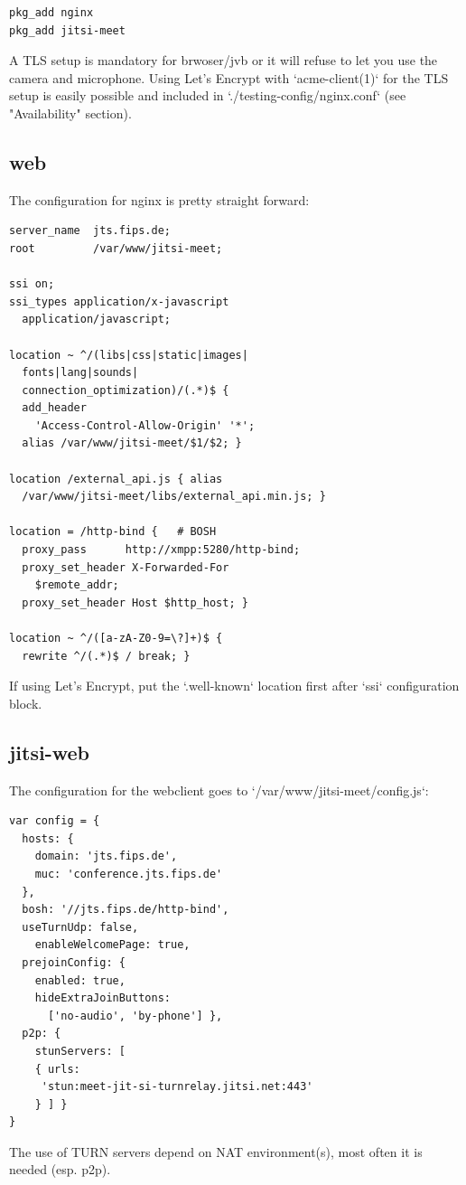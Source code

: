 \documentclass[10pt,conference]{IEEEtran}
\begin{document}
\begin{verbatim}
pkg_add nginx
pkg_add jitsi-meet
\end{verbatim}

A TLS setup is mandatory for brwoser/jvb or it will refuse to let you
use the camera and microphone.
Using Let's Encrypt with `acme-client(1)` for the TLS setup is easily possible and included
in `./testing-config/nginx.conf` (see "Availability" section).

\subsection{web}
The configuration for nginx is pretty straight forward:
\begin{verbatim}
server_name  jts.fips.de;
root         /var/www/jitsi-meet;

ssi on;
ssi_types application/x-javascript
  application/javascript;

location ~ ^/(libs|css|static|images|
  fonts|lang|sounds|
  connection_optimization)/(.*)$ {
  add_header
    'Access-Control-Allow-Origin' '*';
  alias /var/www/jitsi-meet/$1/$2; }

location /external_api.js { alias
  /var/www/jitsi-meet/libs/external_api.min.js; }

location = /http-bind {   # BOSH
  proxy_pass      http://xmpp:5280/http-bind;
  proxy_set_header X-Forwarded-For
    $remote_addr;
  proxy_set_header Host $http_host; }

location ~ ^/([a-zA-Z0-9=\?]+)$ {
  rewrite ^/(.*)$ / break; }
\end{verbatim}

If using Let's Encrypt, put the `.well-known` location first after `ssi` configuration block.

\subsection{jitsi-web}
The configuration for the webclient goes to `/var/www/jitsi-meet/config.js`:
\begin{verbatim}
var config = {
  hosts: {
    domain: 'jts.fips.de',
    muc: 'conference.jts.fips.de'
  },
  bosh: '//jts.fips.de/http-bind',
  useTurnUdp: false,
  	enableWelcomePage: true,
  prejoinConfig: {
    enabled: true,
    hideExtraJoinButtons:
      ['no-audio', 'by-phone'] },
  p2p: {
    stunServers: [
    { urls:
     'stun:meet-jit-si-turnrelay.jitsi.net:443'
    } ] }
}
\end{verbatim}
The use of TURN servers depend on NAT environment(s), most often it is needed (esp. p2p).
\end{document}
